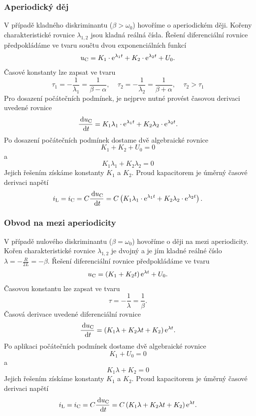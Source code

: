 \subsubsection{Aperiodický děj}

V případě kladného diskriminantu ($\beta > \omega_0$) hovoříme o aperiodickém ději. Kořeny charakteristické rovnice $\lambda_{1,2}$ jsou kladná reálná čísla. Řešení diferenciální rovnice předpokládáme ve tvaru součtu dvou exponenciálních funkcí
$$
u_\mathrm{C} = K_1 \cdot \mathrm{e}^{\lambda_1 t} + K_2 \cdot \mathrm{e}^{\lambda_2 t} + U_0.
$$
Časové konstanty lze zapsat ve tvaru
$$
\tau_1 = - \frac{1}{\lambda_1} = \frac{1}{\beta - \alpha},~~~~~
\tau_2 = - \frac{1}{\lambda_2} = \frac{1}{\beta + \alpha},~~~~~
\tau_2 > \tau_1
$$
Pro dosazení počátečních podmínek, je nejprve nutné provést časovou derivaci uvedené rovnice 
$$
\frac{\,\mathrm{d} u_\mathrm{C}}{\,\mathrm{d} t} = K_1 \lambda_1 \cdot \mathrm{e}^{\lambda_1 t} + K_2 \lambda_2 \cdot \mathrm{e}^{\lambda_2 t}.
$$
Po dosazení počátečních podmínek dostame dvě algebraické rovnice
$$
K_1 + K_2 + U_0 = 0
$$
a
$$
K_1 \lambda_1 + K_2 \lambda_2 = 0
$$
Jejich řešením získáme konstanty $K_1$ a $K_2$. Proud kapacitorem je úměrný časové derivaci napětí
$$
i_\mathrm{L} = i_\mathrm{C} = C \frac{\,\mathrm{d} u_\mathrm{C}}{\,\mathrm{d} t} = C \left( K_1 \lambda_1 \cdot \mathrm{e}^{\lambda_1 t} + K_2 \lambda_2 \cdot \mathrm{e}^{\lambda_2 t} \right).
$$

\subsubsection{Obvod na mezi aperiodicity}

V případě nulového diskriminantu ($\beta = \omega_0$) hovoříme o ději na mezi aperiodicity. Kořen charakteristické rovnice $\lambda_{1,2}$ je dvojný a je jím kladné reálné číslo $\lambda = - \frac{R}{2L} = - \beta$. Řešení diferenciální rovnice předpokládáme ve tvaru
$$
u_\mathrm{C} = \left( K_1 + K_2 t \right) \mathrm{e}^{\lambda t} + U_0.
$$
Časovou konstantu lze zapsat ve tvaru
$$
\tau = - \frac{1}{\lambda} = \frac{1}{\beta}.
$$
Časová derivace uvedené diferenciální rovnice 
$$
\frac{\,\mathrm{d} u_\mathrm{C}}{\,\mathrm{d} t} = \left( K_1 \lambda + K_2 \lambda t + K_2 \right) \mathrm{e}^{\lambda t}.
$$
Po aplikaci počátečních podmínek dostame dvě algebraické rovnice
$$
K_1 + U_0 = 0
$$
a
$$
K_1 \lambda + K_2 = 0
$$
Jejich řešením získáme konstanty $K_1$ a $K_2$. Proud kapacitorem je úměrný časové derivaci napětí
$$
i_\mathrm{L} = i_\mathrm{C} = C \frac{\,\mathrm{d} u_\mathrm{C}}{\,\mathrm{d} t} = C \left( K_1 \lambda + K_2 \lambda t + K_2 \right) \mathrm{e}^{\lambda t} .
$$

